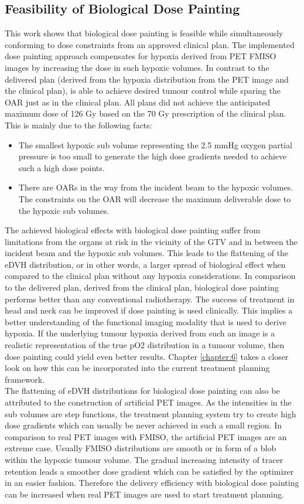 \subsection{Feasibility of Biological Dose Painting}
This work shows that biological dose painting is feasible while simultaneously conforming to dose constraints from an approved clinical plan. The implemented dose painting approach compensates for hypoxia derived from PET FMISO images by increasing the dose in such hypoxic volumes. In contrast to the delivered plan (derived from the hypoxia distribution from the PET image and the clinical plan), is able to achieve desired tumour control while sparing the OAR just as in the clinical plan. All plans did not achieve the anticipated maximum dose of 126 Gy based on the 70 Gy prescription of the clinical plan. This is mainly due to the following facts:
\begin{itemize}
\item The smallest hypoxic sub volume representing the 2.5 mmHg oxygen partial pressure is too small to generate the high dose gradients needed to achieve such a high dose points.
\item There are OARs in the way from the incident beam to the hypoxic volumes. The constraints on the OAR will decrease the maximum deliverable dose to the hypoxic sub volumes.
\end{itemize} 
The achieved biological effects with biological dose painting suffer from limitations from the organs at risk in the vicinity of the GTV and in between the incident beam and the hypoxic sub volumes. This leads to the flattening of the eDVH distribution, or in other words, a larger spread of biological effect when compared to the clinical plan without any hypoxia considerations. In comparison to the delivered plan, derived from the clinical plan, biological dose painting performs better than any conventional radiotherapy. The success of treatment in head and neck can be improved if dose painting is used clinically. This implies a better understanding of the functional imaging modality that is used to derive hypoxia. If the underlying tumour hypoxia derived from such an image is a realistic representation of the true pO2 distribution in a tumour volume, then dose painting could yield even better results. Chapter \ref{chapter:6} takes a closer look on how this can be incorporated into the current treatment planning framework.\\The flattening of eDVH distributions for biological dose painting can also be attributed to the construction of artificial PET images. As the intensities in the sub volumes are step functions, the treatment planning system try to create high dose gradients which can usually be never achieved in such a small region. In comparison to real PET images with FMISO, the artificial PET images are an extreme case. Usually FMISO distributions are smooth or in form of a blob within the hypoxic tumour volume. The gradual increasing intensity of tracer retention leads a smoother dose gradient which can be satisfied by the optimizer in an easier fashion. Therefore the delivery efficiency with biological dose painting can be increased when real PET images are used to start treatment planning.
